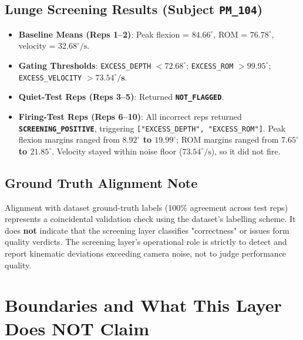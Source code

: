 \subsection{Lunge Screening Results (Subject \texttt{PM\_104})}
\label{sec:10-5-2-lunge-screening-results-subject-texttt-pm-104}

\begin{itemize}
  \item \textbf{Baseline Means (Reps 1–2)}: Peak flexion = \textbf{$84.66^\circ$}, ROM = \textbf{$76.78^\circ$}, velocity = \textbf{$32.68^\circ/\text{s}$}.
  \item \textbf{Gating Thresholds}: \texttt{EXCESS\_DEPTH} $< \mathbf{72.68^\circ}$; \texttt{EXCESS\_ROM} $> \mathbf{99.95^\circ}$; \texttt{EXCESS\_VELOCITY} $> \mathbf{73.54^\circ/\text{s}}$.
  \item \textbf{Quiet-Test Reps (Reps 3–5)}: Returned \textbf{\texttt{NOT\_FLAGGED}}.
  \item \textbf{Firing-Test Reps (Reps 6–10)}: All incorrect reps returned \textbf{\texttt{SCREENING\_POSITIVE}}, triggering \texttt{["EXCESS\_DEPTH", "EXCESS\_ROM"]}. Peak flexion margins ranged from \textbf{$8.92^\circ$ to $19.99^\circ$}; ROM margins ranged from \textbf{$7.65^\circ$ to $21.85^\circ$}. Velocity stayed within noise floor ($73.54^\circ/\text{s}$), so it did not fire.
\end{itemize}

\subsection{Ground Truth Alignment Note}
\label{sec:10-5-3-ground-truth-alignment-note}

Alignment with dataset ground-truth labels (100\% agreement across test reps) represents a coincidental validation check using the dataset's labelling scheme. It does \textbf{not} indicate that the screening layer classifies "correctness" or issues form quality verdicts. The screening layer's operational role is strictly to detect and report kinematic deviations exceeding camera noise, not to judge performance quality.



\section{Boundaries and What This Layer Does NOT Claim}
\label{sec:10-6-boundaries-and-what-this-layer-does-not-claim}


